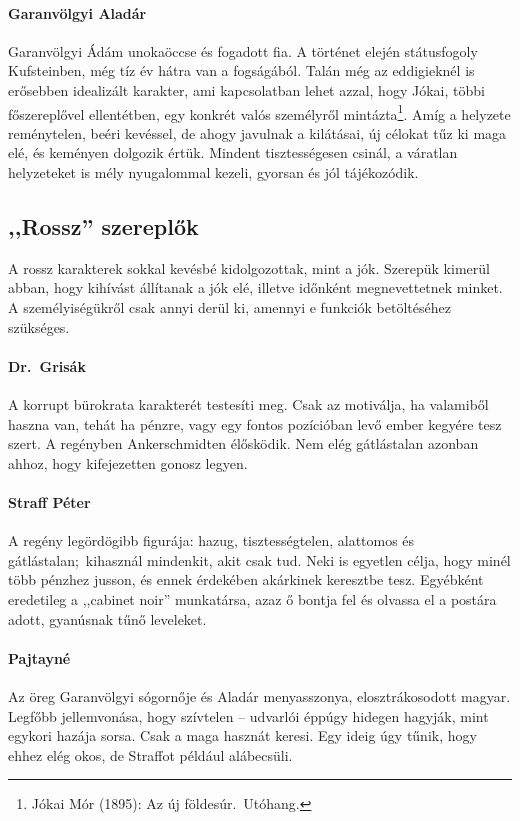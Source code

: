 \documentclass{thesis-ekf}
\begin{document}
    \paragraph{Garanvölgyi Aladár}
    Garanvölgyi Ádám unokaöccse és fogadott fia.
    A történet elején státusfogoly Kufsteinben, még tíz év hátra van a fogságából.
    Talán még az eddigieknél is erősebben idealizált karakter, ami kapcsolatban lehet azzal, hogy Jókai,
        többi főszereplővel ellentétben, egy konkrét valós személyről mintázta\footnote{
        Jókai Mór (1895): Az új földesúr.~Utóhang.
    }.
    Amíg a helyzete reménytelen, beéri kevéssel, de ahogy javulnak a kilátásai, új célokat tűz ki maga elé,
        és keményen dolgozik értük.
    Mindent tisztességesen csinál, a váratlan helyzeteket is mély nyugalommal kezeli, gyorsan és jól tájékozódik.

    \subsection{,,Rossz'' szereplők}
    A rossz karakterek sokkal kevésbé kidolgozottak, mint a jók.
    Szerepük kimerül abban, hogy kihívást állítanak a jók elé, illetve időnként megnevettetnek minket.
    A személyiségükről csak annyi derül ki, amennyi e funkciók betöltéséhez szükséges.

    \paragraph{Dr.~Grisák}
    A korrupt bürokrata karakterét testesíti meg.
    Csak az motiválja, ha valamiből haszna van, tehát ha pénzre, vagy egy fontos pozícióban levő ember kegyére tesz szert.
    A regényben Ankerschmidten élősködik.
    Nem elég gátlástalan azonban ahhoz, hogy kifejezetten gonosz legyen.

    \paragraph{Straff Péter}
    A regény legördögibb figurája: hazug, tisztességtelen, alattomos és gátlástalan;~kihasznál mindenkit, akit csak tud.
    Neki is egyetlen célja, hogy minél több pénzhez jusson, és ennek érdekében akárkinek keresztbe tesz.
    Egyébként eredetileg a ,,cabinet noir'' munkatársa, azaz ő bontja fel és olvassa el a postára adott, gyanúsnak tűnő leveleket.

    \paragraph{Pajtayné}
    Az öreg Garanvölgyi sógornője és Aladár menyasszonya, elosztrákosodott magyar.
    Legfőbb jellemvonása, hogy szívtelen – udvarlói éppúgy hidegen hagyják, mint egykori hazája sorsa.
    Csak a maga hasznát keresi.
    Egy ideig úgy tűnik, hogy ehhez elég okos, de Straffot például alábecsüli.
\end{document}
